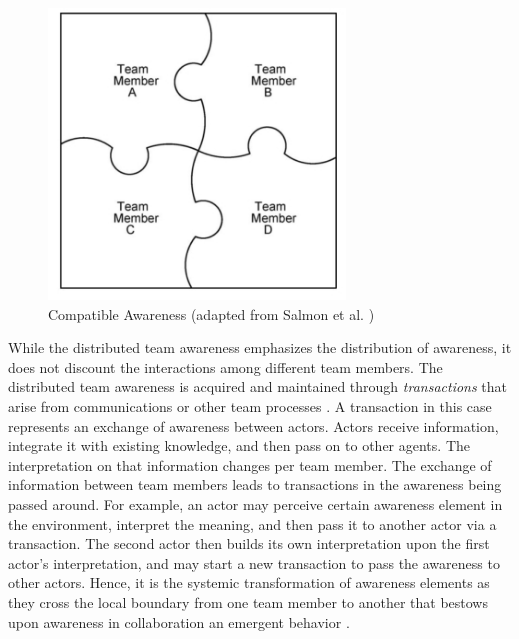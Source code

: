 \begin{figure}[htbp] %
   \centering
   \includegraphics[width=3.1in]{compatible_awareness.jpg} 
   \caption{Compatible Awareness (adapted from Salmon et al. \cite{Stanton2009})}
   \label{fig:compatible_awareness}
\end{figure}

While the distributed team awareness emphasizes the distribution of awareness, it does not discount the interactions among different team members. The distributed team awareness is acquired and maintained through \emph{transactions} that arise from communications or other team processes \cite{Salmon2010}. A transaction in this case represents an exchange of awareness between actors. Actors receive information, integrate it with existing knowledge, and then pass on to other agents. The interpretation on that information changes per team member. The exchange of information between team members leads to transactions in the awareness being passed around. For example, an actor may perceive certain awareness element in the environment, interpret the meaning, and then pass it to another actor via a transaction. The second actor then builds its own interpretation upon the first actor's interpretation, and may start a new transaction to pass the awareness to other actors. Hence, it is the systemic transformation of awareness elements as they cross the local boundary from one team member to another that bestows upon awareness in collaboration an emergent behavior \cite{Stanton2009}.

